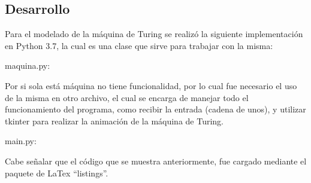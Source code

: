 \subsection{Desarrollo}
	Para el modelado de la máquina de Turing se realizó la siguiente implementación en Python 3.7, la cual es una clase que sirve para trabajar con la misma:

	maquina.py:
	

	Por si sola está máquina no tiene funcionalidad, por lo cual fue necesario el uso de la misma en otro archivo, el cual se encarga de manejar todo el funcionamiento del programa, como recibir la entrada (cadena de unos), y utilizar tkinter para realizar la animación de la máquina de Turing.
	
	main.py:
	

	Cabe señalar que el código que se muestra anteriormente, fue cargado mediante el paquete de LaTex ``listings''.


